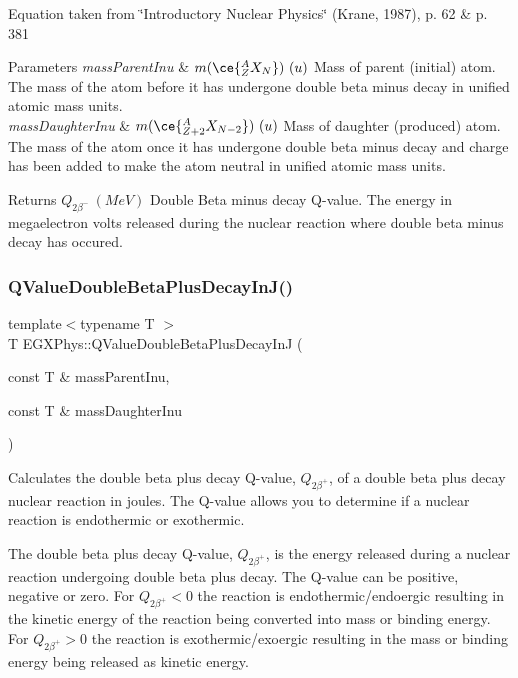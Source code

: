 Equation taken from \char`\"{}\+Introductory Nuclear Physics\char`\"{} (Krane, 1987), p. 62 \& p. 381


\begin{DoxyParams}{Parameters}
{\em mass\+Parent\+Inu} & $m(\ce{ ^{A}_{Z}X_{N} })\ (u)$ Mass of parent (initial) atom. The mass of the atom before it has undergone double beta minus decay in unified atomic mass units. \\
\hline
{\em mass\+Daughter\+Inu} & $m(\ce{ ^{A}_{Z{+2}}X_{N-2} })\ (u)$ Mass of daughter (produced) atom. The mass of the atom once it has undergone double beta minus decay and charge has been added to make the atom neutral in unified atomic mass units. \\
\hline
\end{DoxyParams}
\begin{DoxyReturn}{Returns}
$Q_{2\beta^-}\ (MeV)$ Double Beta minus decay Q-\/value. The energy in megaelectron volts released during the nuclear reaction where double beta minus decay has occured. 
\end{DoxyReturn}
\mbox{\label{group___e_g_x_phys-_q_value_ga7d8dcc2691c2d4de9132e758e149ba51}} 
\subsubsection{\texorpdfstring{Q\+Value\+Double\+Beta\+Plus\+Decay\+In\+J()}{QValueDoubleBetaPlusDecayInJ()}}
{\footnotesize\ttfamily template$<$typename T $>$ \\
T E\+G\+X\+Phys\+::\+Q\+Value\+Double\+Beta\+Plus\+Decay\+InJ (\begin{DoxyParamCaption}\item[{const T \&}]{mass\+Parent\+Inu,  }\item[{const T \&}]{mass\+Daughter\+Inu }\end{DoxyParamCaption})}



Calculates the double beta plus decay Q-\/value, $Q_{2\beta^+}$, of a double beta plus decay nuclear reaction in joules. The Q-\/value allows you to determine if a nuclear reaction is endothermic or exothermic. 

The double beta plus decay Q-\/value, $Q_{2\beta^+}$, is the energy released during a nuclear reaction undergoing double beta plus decay. The Q-\/value can be positive, negative or zero. For $Q_{2\beta^+} < 0$ the reaction is endothermic/endoergic resulting in the kinetic energy of the reaction being converted into mass or binding energy. For $Q_{2\beta^+} > 0$ the reaction is exothermic/exoergic resulting in the mass or binding energy being released as kinetic energy.

